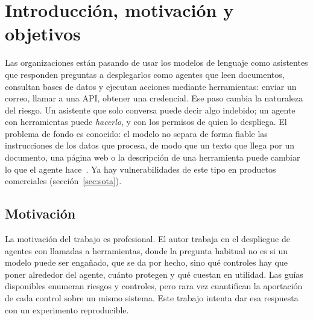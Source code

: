 \documentclass[11pt,a4paper]{article}
\begin{document}
\tableofcontents
\newpage


\section{Introducción, motivación y objetivos}
\label{sec:intro}
Las organizaciones están pasando de usar los modelos de lenguaje como asistentes que responden preguntas a
desplegarlos como agentes que leen documentos, consultan bases de datos y ejecutan acciones mediante
herramientas: enviar un correo, llamar a una API, obtener una credencial. Ese paso cambia la naturaleza del
riesgo. Un asistente que solo conversa puede decir algo indebido; un agente con herramientas puede
\emph{hacerlo}, y con los permisos de quien lo despliega. El problema de fondo es conocido: el modelo no separa de
forma fiable las instrucciones de los datos que procesa, de modo que un texto que llega por un documento, una
página web o la descripción de una herramienta puede cambiar lo que el agente hace~\cite{greshake2023,owasp_asi_2026}.
Ya hay vulnerabilidades de este tipo en productos comerciales (sección~\ref{sec:sota}).

\subsection{Motivación}
La motivación del trabajo es profesional. El autor trabaja en el despliegue de agentes con llamadas a
herramientas, donde la pregunta habitual no es si un modelo puede ser engañado, que se da por hecho, sino qué
controles hay que poner alrededor del agente, cuánto protegen y qué cuestan en utilidad. Las guías disponibles
enumeran riesgos y controles, pero rara vez cuantifican la aportación de cada control sobre un mismo sistema.
Este trabajo intenta dar esa respuesta con un experimento reproducible.
\end{document}
